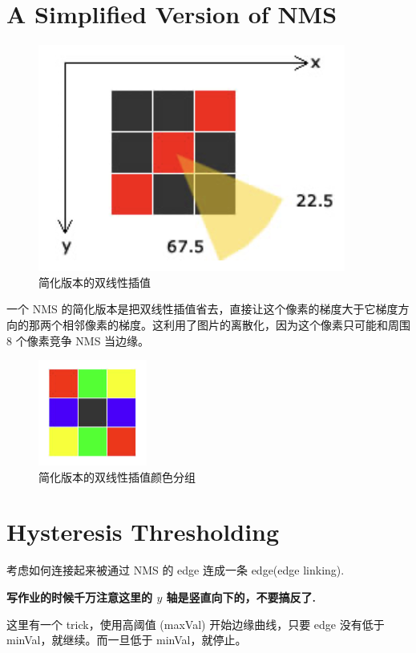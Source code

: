 \section{A Simplified Version of NMS}

\begin{figure}[htbp]
    \centering
	\includegraphics[scale=0.55]{figures/simple_NMS.png}
	\caption{简化版本的双线性插值}
\end{figure}

一个 NMS 的简化版本是把双线性插值省去，直接让这个像素的梯度大于它梯度方向的那两个相邻像素的梯度。这利用了图片的离散化，因为这个像素只可能和周围 8 个像素竞争 NMS 当边缘。

\begin{figure}[htbp]
    \centering
	\includegraphics[scale=0.55]{figures/simple_NMS_2.png}
	\caption{简化版本的双线性插值颜色分组}
\end{figure}

\section{Hysteresis Thresholding}

考虑如何连接起来被通过 NMS 的 edge 连成一条 edge(edge linking).

\textbf{写作业的时候千万注意这里的 $y$ 轴是竖直向下的，不要搞反了.}

这里有一个 trick，使用高阈值 (maxVal) 开始边缘曲线，只要 edge 没有低于 minVal，就继续。而一旦低于 minVal，就停止。

